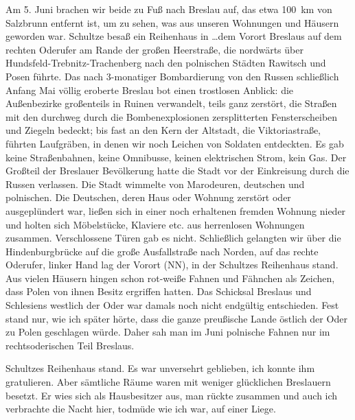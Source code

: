 Am 5. Juni brachen wir beide zu Fuß nach Breslau auf, das etwa 100~km von Salzbrunn entfernt ist, um zu sehen, was aus unseren Wohnungen und Häusern geworden  war. Schultze besaß ein Reihenhaus in \dots dem Vorort Breslaus auf dem rechten Oderufer am Rande der großen Heerstraße, die nordwärts über Hundsfeld-Trebnitz-Trachenberg nach den polnischen Städten Rawitsch und Posen führte. Das nach 3-monatiger Bombardierung von den Russen schließlich Anfang Mai völlig eroberte Breslau bot einen trostlosen Anblick: die Außenbezirke großenteils in Ruinen verwandelt, teils ganz zerstört, die Straßen mit den durchweg durch die Bombenexplosionen zersplitterten Fensterscheiben und Ziegeln bedeckt; bis fast an den Kern der Altstadt, die Viktoriastraße, führten Laufgräben, in denen wir noch Leichen von Soldaten entdeckten. Es gab keine Straßenbahnen, keine Omnibusse, keinen elektrischen Strom, kein Gas. Der Großteil der Breslauer Bevölkerung hatte die Stadt vor der Einkreisung durch die Russen verlassen. Die Stadt wimmelte von Marodeuren, deutschen und polnischen. Die Deutschen, deren Haus oder Wohnung zerstört oder ausgeplündert war, ließen sich in einer noch erhaltenen fremden Wohnung nieder und holten sich Möbelstücke, Klaviere etc. aus herrenlosen Wohnungen zusammen. Verschlossene Türen gab es nicht. Schließlich gelangten wir  über die Hindenburgbrücke auf die große Ausfallstraße nach Norden, auf das rechte Oderufer, linker Hand lag der Vorort (NN), in der Schultzes Reihenhaus stand. Aus vielen Häusern hingen schon rot-weiße Fahnen und Fähnchen als Zeichen, dass Polen von ihnen Besitz ergriffen hatten. Das Schicksal Breslaus und Schlesiens westlich der Oder war damals noch nicht endgültig entschieden. Fest stand nur, wie ich später hörte, dass die ganze preußische Lande östlich der Oder zu Polen geschlagen würde. Daher sah man im Juni polnische Fahnen nur im rechtsoderischen Teil Breslaus.

Schultzes Reihenhaus stand. Es war unversehrt geblieben, ich konnte ihm gratulieren. Aber sämtliche Räume waren mit weniger glücklichen Breslauern besetzt. Er wies sich als Hausbesitzer aus, man rückte zusammen und auch ich verbrachte die Nacht hier, todmüde wie ich war, auf einer Liege.


